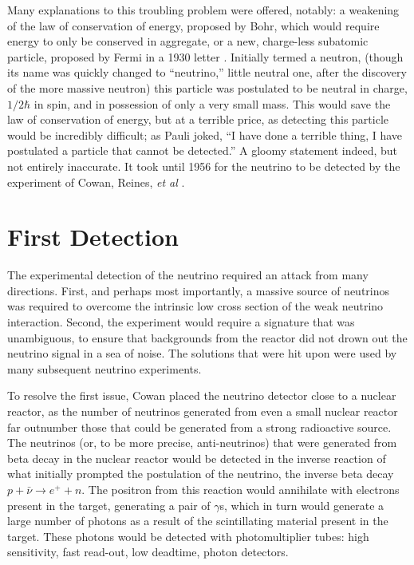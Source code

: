Many explanations to this troubling problem were offered, notably: a weakening of the law of conservation of energy, proposed by Bohr, which would require energy to only be conserved in aggregate, or a new, charge-less subatomic particle, proposed by Fermi in a 1930 letter \cite{Fermi}. Initially termed a neutron, (though its name was quickly changed to ``neutrino,'' little neutral one, after the discovery of the more massive neutron) this particle was postulated to be neutral in charge, $1/2 \hbar$ in spin, and in possession of only a very small mass. This would save the law of conservation of energy, but at a terrible price, as detecting this particle would be incredibly difficult; as Pauli joked, ``I have done a terrible thing, I have postulated a particle that cannot be detected.'' \cite{Pauli} A gloomy statement indeed, but not entirely inaccurate. It took until 1956 for the neutrino to be detected by the experiment of Cowan, Reines, \emph{et al} \cite{Cowan}. 

\section{First Detection}
  The experimental detection of the neutrino required an attack from many directions. First, and perhaps most importantly, a massive source of neutrinos was required to overcome the intrinsic low cross section of the weak neutrino interaction. Second, the experiment would require a signature that was unambiguous, to ensure that backgrounds from the reactor did not drown out the neutrino signal in a sea of noise. The solutions that were hit upon were used by many subsequent neutrino experiments. 
 
 To resolve the first issue, Cowan placed the neutrino detector close to a nuclear reactor, as the number of neutrinos generated from even a small nuclear reactor far outnumber those that could be generated from a strong radioactive source. The neutrinos (or, to be more precise, anti-neutrinos) that were generated from beta decay in the nuclear reactor would be detected in the inverse reaction of what initially prompted the postulation of the neutrino, the inverse beta decay $p + \bar{\nu} \rightarrow e^{+} + n$. The positron from this reaction would annihilate with electrons present in the target, generating a pair of $\gamma$s, which in turn would generate a large number of photons as a result of the scintillating material present in the target.  These photons would be detected with photomultiplier tubes: high sensitivity, fast read-out, low deadtime, photon detectors.
 
